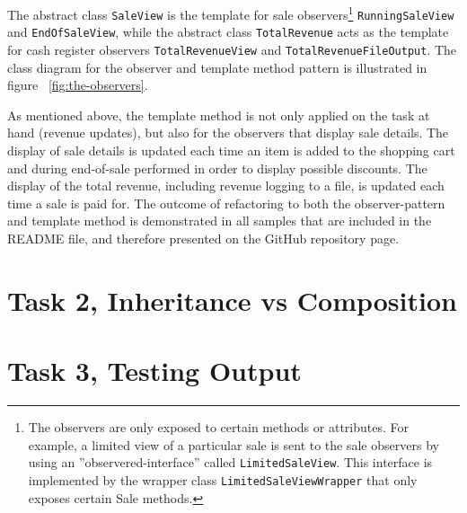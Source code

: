 \documentclass[a4paper]{scrreprt}
\newenvironment{longlisting}{\captionsetup{type=listing}}{}
\begin{document}
The abstract class
\texttt{SaleView} is the template
for sale observers\footnote{The observers are only exposed to certain methods or attributes.
For example, a limited view of a particular sale is sent to the
sale observers by using an ''observered-interface'' called
\texttt{LimitedSaleView}.
This interface is implemented by the wrapper class
\texttt{LimitedSaleViewWrapper} that
only exposes certain Sale methods.}
\texttt{RunningSaleView} and
\texttt{EndOfSaleView},
while the abstract class
\texttt{TotalRevenue}
acts as the template for cash register observers
\texttt{TotalRevenueView} and
\texttt{TotalRevenueFileOutput}.
The class diagram for the observer and template method pattern
is illustrated in figure ~\ref{fig:the-observers}.

As mentioned above, the template method
is not only applied on the task at hand (revenue updates),
but also for the observers that display sale details.
The display of sale details is updated each time an item is added to the shopping cart
and during end-of-sale performed in order to display possible discounts.
The display of the total revenue, including revenue logging to a file, is updated
each time a sale is paid for.
The outcome of refactoring to both the observer-pattern and template method
is demonstrated in all samples that are included in the README file,
and therefore presented on the GitHub repository page.

\section*{Task 2, Inheritance vs Composition}
\section*{Task 3, Testing Output}

\end{document}
